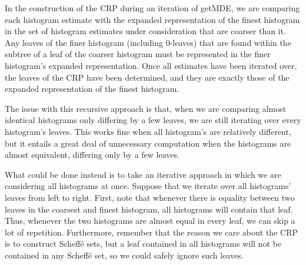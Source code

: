 \documentclass{report}
\begin{document}
In the construction of the CRP during an iteration of getMDE, we are comparing each histogram estimate with the expanded representation of the finest histogram in the set of histogram estimates under consideration that are coarser than it. Any leaves of the finer histogram (including 0-leaves) that are found within the subtree of a leaf of the coarser histogram must be represented in the finer histogram's expanded representation. Once all estimates have been iterated over, the leaves of the CRP have been determined, and they are exactly those of the expanded representation of the finest histogram.

The issue with this recursive approach is that, when we are comparing almost identical histograms 
only differing by a few leaves, we are still iterating over every histogram's leaves. This works fine
when all histogram's are relatively different, but it entails a great deal of unnecessary computation when
the histograms are almost equivalent, differing only by a few leaves.

What could be done instead is to take an iterative approach in which we are considering all histograms
at once. Suppose that we iterate over all histograms' leaves from left to right. First, note that 
whenever there is equality between two leaves in the coarsest and finest histogram, all histograms
will contain that leaf. Thus, whenever
the two histograms are almost equal in every leaf, we can skip a lot of repetition. Furthermore, 
remember that the reason we care about the CRP is to construct Scheffé sets, but a leaf contained 
in all histograms will not be contained in any Scheffé set, so we could safely ignore such leaves.
\end{document}
